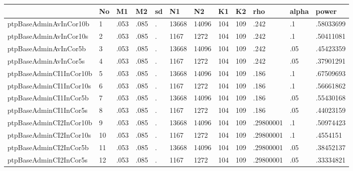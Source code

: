 \begin{tabular}{|l|l|l|l|l|l|l|l|l|l|l|l|}\hline  
 & No  & M1  & M2  & sd  & N1  & N2  & K1  & K2  & rho  & alpha  & power  \\ \hline  
ptpBaseAdminAvInCor10b & 1 & .053 & .085 & . & 13668 & 14096 & 104 & 109 & .242 & .1 & .58033699 \\ \hline 
ptpBaseAdminAvInCor10s & 2 & .053 & .085 & . & 1167 & 1272 & 104 & 109 & .242 & .1 & .50411081 \\ \hline 
ptpBaseAdminAvInCor5b & 3 & .053 & .085 & . & 13668 & 14096 & 104 & 109 & .242 & .05 & .45423359 \\ \hline 
ptpBaseAdminAvInCor5s & 4 & .053 & .085 & . & 1167 & 1272 & 104 & 109 & .242 & .05 & .37901291 \\ \hline 
ptpBaseAdminCI1InCor10b & 5 & .053 & .085 & . & 13668 & 14096 & 104 & 109 & .186 & .1 & .67509693 \\ \hline 
ptpBaseAdminCI1InCor10s & 6 & .053 & .085 & . & 1167 & 1272 & 104 & 109 & .186 & .1 & .56661862 \\ \hline 
ptpBaseAdminCI1InCor5b & 7 & .053 & .085 & . & 13668 & 14096 & 104 & 109 & .186 & .05 & .55430168 \\ \hline 
ptpBaseAdminCI1InCor5s & 8 & .053 & .085 & . & 1167 & 1272 & 104 & 109 & .186 & .05 & .44023159 \\ \hline 
ptpBaseAdminCI2InCor10b & 9 & .053 & .085 & . & 13668 & 14096 & 104 & 109 & .29800001 & .1 & .50974423 \\ \hline 
ptpBaseAdminCI2InCor10s & 10 & .053 & .085 & . & 1167 & 1272 & 104 & 109 & .29800001 & .1 & .4554151 \\ \hline 
ptpBaseAdminCI2InCor5b & 11 & .053 & .085 & . & 13668 & 14096 & 104 & 109 & .29800001 & .05 & .38452137 \\ \hline 
ptpBaseAdminCI2InCor5s & 12 & .053 & .085 & . & 1167 & 1272 & 104 & 109 & .29800001 & .05 & .33334821 \\ \hline 
  \end{tabular}
